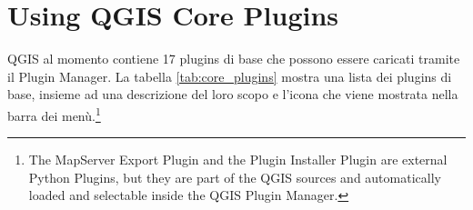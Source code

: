 
\section{Using QGIS Core Plugins}\label{sec:core_plugins}


QGIS al momento contiene 17 plugins di base che possono essere caricati tramite
il Plugin Manager.
La tabella \ref{tab:core_plugins} mostra una lista dei plugins di base, insieme
ad una descrizione del loro scopo e l'icona che viene mostrata nella barra dei
menù.\footnote{The MapServer
Export Plugin and the Plugin Installer Plugin are external Python Plugins,
but they are part of the QGIS sources and automatically loaded and selectable 
inside the QGIS Plugin Manager.}

